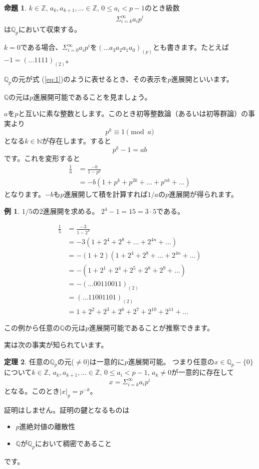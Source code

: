 \documentclass[uplatex]{jsarticle}
\newcommand{\Z}{\mathbb{Z}}
\newcommand{\Q}{\mathbb{Q}}
\theoremstyle{definition} %
\newtheorem{thm}{定理}
\newtheorem{prop}[thm]{命題}
\newtheorem*{example*}{例}
\begin{document}
\begin{oframed}\begin{prop}
$k \in \Z$, $a_k, a_{k+1}, \dots \in \Z$, $0 \le a_i < p-1$のとき級数
\begin{align}
\Sigma_{i=k}^\infty a_i p^i \label{eq:1}
\end{align}
は$\Q_p$において収束する。
\end{prop}\end{oframed}

$k=0$である場合、$\Sigma_{i=0}^\infty a_i p^i$を$(\dots a_3 a_2 a_1 a_0)_{(p)}$とも書きます。たとえば $-1 = (\dots 1 1 1 1)_{(2)}$。

$\Q_p$の元が式 (\ref{eq:1})のように表せるとき、その表示を$p$進展開といいます。

$\Q$の元は$p$進展開可能であることを見ましょう。

$a$を$p$と互いに素な整数とします。このとき初等整数論（あるいは初等群論）の事実より
\[p^k \equiv 1 \pmod a\]
となる$k \in \mathbb{N}$が存在します。すると
\[p^k-1 = ab\]
です。これを変形すると
\begin{align*}
\frac{1}{a} &= \frac{-b}{1-p^k} \\
&= -b(1+p^k+p^{2k}+\dots+p^{nk}+\dots)
\end{align*}
となります。$-b$も$p$進展開して積を計算すれば$1/a$の$p$進展開が得られます。

\begin{example*}
$1/5$の$2$進展開を求める。
$2^4-1 = 15 = 3 \cdot 5$である。

\begin{align*}
\frac{1}{5} &= \frac{-3}{1-2^4} \\
&= -3 (1 + 2^4 + 2^8 + \dots+ 2^{4n} + \dots) \\
&= -(1+2) (1 + 2^4 + 2^8 + \dots+ 2^{4n} + \dots) \\
&= -(1 + 2^1 + 2^4 + 2^5 + 2^8 + 2^9 + \dots) \\
&= -(\dots 00110011)_{(2)} \\
&= (\dots 11001101)_{(2)} \\
&= 1 + 2^2 + 2^3 + 2^6 + 2^7 + 2^{10} + 2^{11} + \dots
\end{align*}
\end{example*}

この例から任意の$\Q$の元は$p$進展開可能であることが推察できます。

実は次の事実が知られています。
\begin{oframed}\begin{thm}
任意の$\Q_p$の元($\ne 0$)は一意的に$p$進展開可能。
つまり任意の$x \in \Q_p- \{0\}$について$k \in \Z$, $a_k, a_{k+1}, \dots \in \Z$, $0 \le a_i < p-1$, $a_k \ne 0$が一意的に存在して
\[x = \Sigma_{i=k}^\infty a_i p^i\]
となる。このとき$|x|_p = p^{-k}$。
\end{thm}\end{oframed}
証明はしません。証明の鍵となるものは
\begin{itemize}
\item $p$進絶対値の離散性
\item $\Q$が$\Q_p$において稠密であること
\end{itemize}
です。
\end{document}

